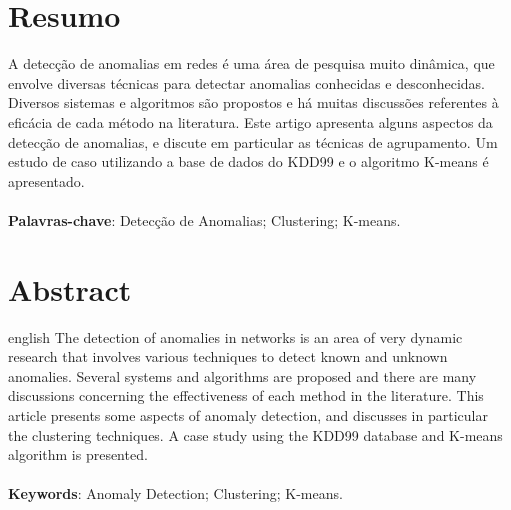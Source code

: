 \documentclass[article,12pt,oneside,a4paper,english,brazil]{unifil}
\date{}
\begin{document}
\frenchspacing
\maketitle
\normalsize

\fontsize{10}{1}\selectfont
\section*{Resumo}
A detecção de anomalias em redes é uma área de pesquisa muito dinâmica, que envolve diversas técnicas para detectar anomalias conhecidas e desconhecidas. Diversos sistemas e algoritmos são propostos e há muitas discussões referentes à eficácia de cada método na literatura. Este artigo apresenta alguns aspectos da detecção de anomalias, e discute em particular as técnicas de agrupamento. Um estudo de caso utilizando a base de dados do KDD99 e o algoritmo K-means é apresentado.\\
\vspace{\onelineskip} \\
\noindent
\textbf{Palavras-chave}: Detecção de Anomalias; Clustering; K-means.



\section*{Abstract}
\begin{otherlanguage*}{english}
The detection of anomalies in networks is an area of very dynamic research that involves various techniques to detect known and unknown anomalies. Several systems and algorithms are proposed and there are many discussions concerning the effectiveness of each method in the literature. This article presents some aspects of anomaly detection, and discusses in particular the clustering techniques. A case study using the KDD99 database and K-means algorithm is presented.\\
\vspace{\onelineskip}\\
\noindent
\textbf{Keywords}: Anomaly Detection; Clustering; K-means.
\end{otherlanguage*}
\end{document}
